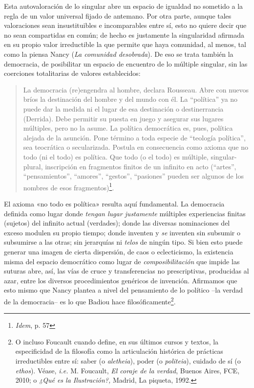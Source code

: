 Esta autovaloración de lo singular abre un espacio de igualdad no sometido a la regla de un valor universal fijado de antemano. Por otra parte, aunque tales valoraciones sean insustituibles e incomparables entre sí, esto no quiere decir que no sean compartidas en común; de hecho es justamente la singularidad afirmada en su propio valor irreductible la que permite que haya comunidad, al menos, tal como la piensa Nancy (\emph{La comunidad desobrada}). De eso se trata también la democracia, de posibilitar un espacio de encuentro de lo múltiple singular, sin las coerciones totalitarias de valores establecidos:

\begin{quote}
La democracia (re)engendra al hombre, declara Rousseau. Abre con nuevos bríos la destinación del hombre y del mundo con él. La ``política'' ya no puede dar la medida ni el lugar de esa destinación o destinerrancia (Derrida). Debe permitir su puesta en juego y asegurar sus lugares múltiples, pero no la asume. La política democrática es, pues, política alejada de la asunción. Pone término a toda especie de ``teología política'', sea teocrática o secularizada. Postula en consecuencia como axioma que no todo (ni el todo) es política. Que todo (o el todo) es múltiple, singular-plural, inscripción en fragmentos finitos de un infinito en acto (``artes'', ``pensamientos'', ``amores'', ``gestos'', ``pasiones'' pueden ser algunos de los nombres de esos fragmentos)\footnote{\emph{Idem}, p. 57}.
\end{quote}

El axioma «no todo es política» resulta aquí fundamental. La democracia definida como lugar donde \emph{tengan lugar justamente} múltiples experiencias finitas (sujetos) del infinito actual (verdades); donde las diversas nominaciones del exceso modulen su propio tiempo; donde inventen y \emph{se} inventen sin subsumir o subsumirse a las otras; sin jerarquías ni \emph{telos} de ningún tipo. Si bien esto puede generar una imagen de cierta dispersión, de caos o eclecticismo, la existencia misma del espacio democrático como lugar de \emph{composibilitación} que impide las suturas abre, así, las vías de cruce y transferencias no prescriptivas, producidas al azar, entre los diversos procedimientos genéricos de invención. Afirmamos que esto mismo que Nancy plantea a nivel del pensamiento de lo político --la verdad de la democracia-- es lo que Badiou hace filosóficamente\footnote{O incluso Foucault cuando define, en sus últimos cursos y textos, la especificidad de la filosofía como la articulación histórica de prácticas irreductibles entre sí: saber (o \emph{aletheia}), poder (o \emph{politeia}), cuidado de sí (o \emph{ethos}). Véase, \emph{i.e.} M. Foucault, \emph{El coraje de la verdad}, Buenos Aires, FCE, 2010; o \emph{¿Qué es la Ilustración?,} Madrid, La piqueta, 1992.}.

